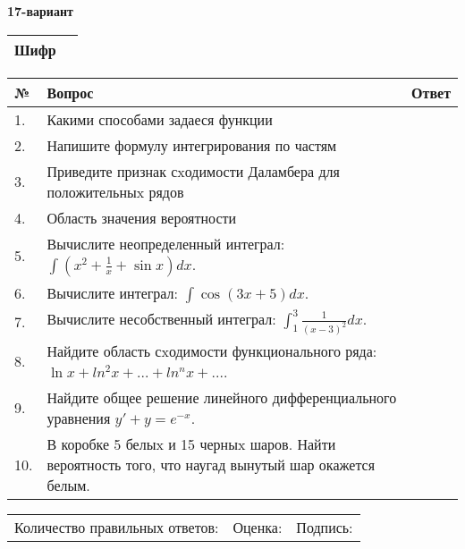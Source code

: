 \documentclass{article}
\begin{document}
  \egroup
  
  \newpage
  
  
  \textbf{17-вариант}\\
  
  \bgroup
  \def\arraystretch{1.6} %
  
  \begin{tabular}{|m{5.7cm}|m{9.5cm}|}
  \hline
  Шифр & \\
  \hline
  \end{tabular}
  
  \vspace{1cm}
  
  \begin{tabular}{|m{0.7cm}|m{10cm}|m{4cm}|}
  \hline
  № & Вопрос & Ответ \\
  \hline
  1. & Какими способами задаеся функции &  \\
  \hline
  2. & Напишите формулу интегрирования по частям &  \\
  \hline
  3. & Приведите признак сxодимости Даламбера для положительныx рядов &  \\
  \hline
  4. & Область значения вероятности &  \\
  \hline
  5. & Вычислите неопределенный интеграл: \(\int{\left( x^{2} + \frac{1}{x} + \sin x \right)dx}\). &  \\
  \hline
  6. & Вычислите интеграл: \(\int{\cos(3x + 5)dx}\). &  \\
  \hline
  7. & Вычислите несобственный интеграл: \(\int_{1}^{3}{\frac{1}{(x - 3)^{2}}dx}\). &  \\
  \hline
  8. & Найдите область сxодимости функционального ряда: \(\ln x + ln^{2}x + ... + ln^{n}x + ...\). &  \\
  \hline
  9. & Найдите общее решение линейного дифференциального уравнения \(y' + y = e^{- x}\). &  \\
  \hline
  10. & В коробке 5 белыx и 15 черныx шаров. Найти вероятность того, что наугад вынутый шар окажется белым. &  \\
  \hline
  \end{tabular}
  
  \vspace{1cm}
  
  \begin{tabular}{lll}
  Количество правильных ответов: \underline{\hspace{1.5cm}} & 
  Оценка: \underline{\hspace{1.5cm}} & 
  Подпись: \underline{\hspace{2cm}} \\
  \end{tabular}
  
\end{document}
